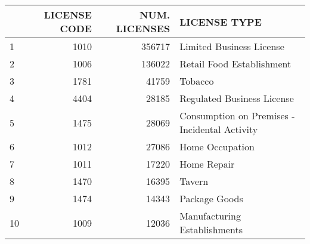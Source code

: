 \documentclass[preview]{standalone}
\begin{document}
            \begin{tabular}{lrrl}
\toprule
{} &  LICENSE CODE &  NUM. LICENSES &                                   LICENSE TYPE \\
\midrule
1  &          1010 &         356717 &                       Limited Business License \\
2  &          1006 &         136022 &                      Retail Food Establishment \\
3  &          1781 &          41759 &                                        Tobacco \\
4  &          4404 &          28185 &                     Regulated Business License \\
5  &          1475 &          28069 &  Consumption on Premises - Incidental Activity \\
6  &          1012 &          27086 &                                Home Occupation \\
7  &          1011 &          17220 &                                    Home Repair \\
8  &          1470 &          16395 &                                         Tavern \\
9  &          1474 &          14343 &                                  Package Goods \\
10 &          1009 &          12036 &                   Manufacturing Establishments \\
\bottomrule
\end{tabular}

            
\end{document}
